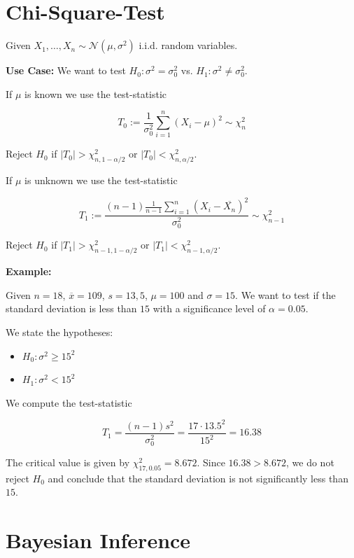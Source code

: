 \section{Chi-Square-Test}

Given \(X_1, \dots, X_n \sim \mathcal{N}(\mu, \sigma^2)\) i.i.d. random variables.

\textbf{Use Case:} We want to test \(H_0: \sigma^2 = \sigma_0^2\) vs. \(H_1: \sigma^2 \ne \sigma_0^2\).

If \(\mu\) is known we use the test-statistic 

\[
    T_0 := \frac{1}{\sigma_0^2} \sum_{i = 1}^{n} (X_i - \mu)^2 \sim \chi^2_n 
\]

Reject \(H_0\) if \(|T_0| > \chi^2_{n, 1 - \alpha/2}\) or \(|T_0| < \chi^2_{n, \alpha/2}\).

If \(\mu\) is unknown we use the test-statistic 

\[
    T_1 := \frac{(n  - 1)\frac{1}{n - 1} \sum_{i = 1}^{n} (X_i - \overline{X_n})^2}{\sigma_0^2} \sim \chi^2_{n - 1} 
\]

Reject \(H_0\) if \(|T_1| > \chi^2_{n - 1, 1 - \alpha/2}\) or \(|T_1| < \chi^2_{n - 1, \alpha/2}\).

\textbf{Example:}

Given \(n = 18\), \(\overline{x} = 109\), \(s = 13,5\), \(\mu = 100\) and \(\sigma = 15\). We 
want to test if the standard deviation is less than \(15\) with a significance level of \(\alpha = 0.05\). 

We state the hypotheses:

\begin{itemize}

    \item \(H_0: \sigma^2 \ge 15^2\)

    \item \(H_1: \sigma^2 < 15^2\)

\end{itemize}

We compute the test-statistic

\[
    T_1 = \frac{(n - 1)s^2}{\sigma_0^2} = \frac{17 \cdot 13.5^2}{15^2} = 16.38
\]

The critical value is given by \(\chi_{17, 0.05}^2 = 8.672\). Since \(16.38 > 8.672\), we do not reject \(H_0\) and conclude that the 
standard deviation is not significantly less than \(15\).

\section{Bayesian Inference}

